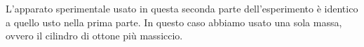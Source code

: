 L'apparato sperimentale usato in questa seconda parte dell'esperimento è
identico a quello usto nella prima parte. In questo caso abbiamo usato una sola massa,
ovvero il cilindro di ottone più massiccio.
